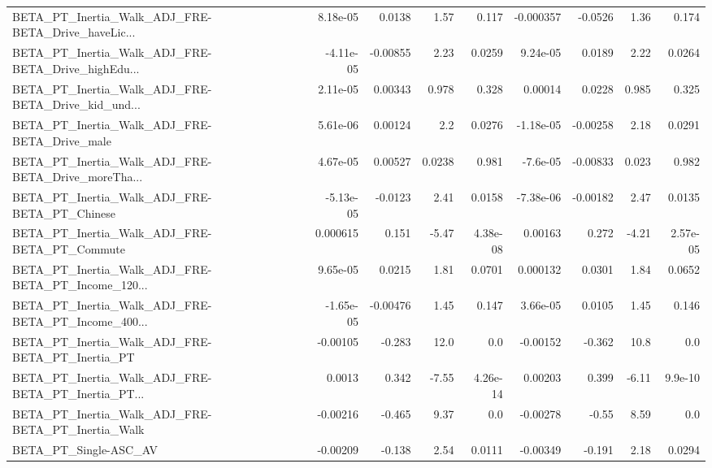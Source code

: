 \begin{tabular}{lrrrrrrrr}
BETA\_PT\_Inertia\_Walk\_ADJ\_FRE-BETA\_Drive\_haveLic... &    8.18e-05 &       0.0138 &     1.57 &    0.117 &  -0.000357 &     -0.0526 &         1.36 &         0.174 \\
BETA\_PT\_Inertia\_Walk\_ADJ\_FRE-BETA\_Drive\_highEdu... &   -4.11e-05 &     -0.00855 &     2.23 &   0.0259 &   9.24e-05 &      0.0189 &         2.22 &        0.0264 \\
BETA\_PT\_Inertia\_Walk\_ADJ\_FRE-BETA\_Drive\_kid\_und... &    2.11e-05 &      0.00343 &    0.978 &    0.328 &    0.00014 &      0.0228 &        0.985 &         0.325 \\
BETA\_PT\_Inertia\_Walk\_ADJ\_FRE-BETA\_Drive\_male       &    5.61e-06 &      0.00124 &      2.2 &   0.0276 &  -1.18e-05 &    -0.00258 &         2.18 &        0.0291 \\
BETA\_PT\_Inertia\_Walk\_ADJ\_FRE-BETA\_Drive\_moreTha... &    4.67e-05 &      0.00527 &   0.0238 &    0.981 &   -7.6e-05 &    -0.00833 &        0.023 &         0.982 \\
BETA\_PT\_Inertia\_Walk\_ADJ\_FRE-BETA\_PT\_Chinese       &   -5.13e-05 &      -0.0123 &     2.41 &   0.0158 &  -7.38e-06 &    -0.00182 &         2.47 &        0.0135 \\
BETA\_PT\_Inertia\_Walk\_ADJ\_FRE-BETA\_PT\_Commute       &    0.000615 &        0.151 &    -5.47 & 4.38e-08 &    0.00163 &       0.272 &        -4.21 &      2.57e-05 \\
BETA\_PT\_Inertia\_Walk\_ADJ\_FRE-BETA\_PT\_Income\_120... &    9.65e-05 &       0.0215 &     1.81 &   0.0701 &   0.000132 &      0.0301 &         1.84 &        0.0652 \\
BETA\_PT\_Inertia\_Walk\_ADJ\_FRE-BETA\_PT\_Income\_400... &   -1.65e-05 &     -0.00476 &     1.45 &    0.147 &   3.66e-05 &      0.0105 &         1.45 &         0.146 \\
BETA\_PT\_Inertia\_Walk\_ADJ\_FRE-BETA\_PT\_Inertia\_PT    &    -0.00105 &       -0.283 &     12.0 &      0.0 &   -0.00152 &      -0.362 &         10.8 &           0.0 \\
BETA\_PT\_Inertia\_Walk\_ADJ\_FRE-BETA\_PT\_Inertia\_PT... &      0.0013 &        0.342 &    -7.55 & 4.26e-14 &    0.00203 &       0.399 &        -6.11 &       9.9e-10 \\
BETA\_PT\_Inertia\_Walk\_ADJ\_FRE-BETA\_PT\_Inertia\_Walk  &    -0.00216 &       -0.465 &     9.37 &      0.0 &   -0.00278 &       -0.55 &         8.59 &           0.0 \\
BETA\_PT\_Single-ASC\_AV                              &    -0.00209 &       -0.138 &     2.54 &   0.0111 &   -0.00349 &      -0.191 &         2.18 &        0.0294 \\

\end{tabular}
